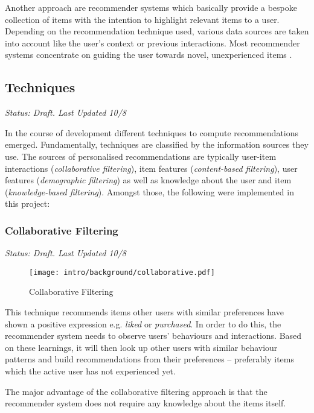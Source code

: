Another approach are recommender systems which basically provide a bespoke collection of items with the intention to highlight relevant items to a user. Depending on the recommendation technique used, various data sources are taken into account like the user's context or previous interactions. Most recommender systems concentrate on guiding the user towards novel, unexperienced items \cite{herlocker04}.

\subsection{Techniques}

\emph{Status: Draft. Last Updated 10/8}

In the course of development different techniques to compute recommendations emerged. Fundamentally, techniques are classified by the information sources they use. The sources of personalised recommendations are typically user-item interactions (\emph{collaborative filtering}), item features (\emph{content-based filtering}), user features (\emph{demographic filtering}) as well as knowledge about the user and item (\emph{knowledge-based filtering}). Amongst those, the following were implemented in this project:

\subsubsection{Collaborative Filtering}
\label{intro-bg-tech-collaborative}

\emph{Status: Draft. Last Updated 10/8}

\begin{figure}[ht]
    \texttt{[image: intro/background/collaborative.pdf]}
    \caption{Collaborative Filtering}
    \label{fig:collaborative}
\end{figure}

This technique recommends items other users with similar preferences have shown a positive expression e.g. \emph{liked} or \emph{purchased}. In order to do this, the recommender system needs to observe users' behaviours and interactions. Based on these learnings, it will then look up other users with similar behaviour patterns and build recommendations from their preferences -- preferably items which the active user has not experienced yet.

The major advantage of the collaborative filtering approach is that the recommender system does not require any knowledge about the items itself.

